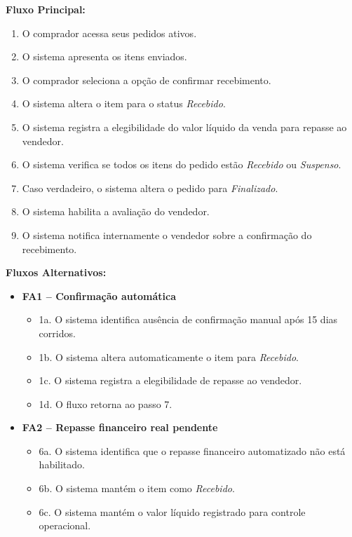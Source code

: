 \documentclass[
	article,			%
	11pt,				%
	oneside,			%
	a4paper,			%
	english,			%
	brazil,				%
	sumario=tradicional
	]{abntex2}
\begin{document}
\vspace{0.5em}
\noindent\textbf{Fluxo Principal:}
\begin{enumerate}[label=\arabic*.]
    \item O comprador acessa seus pedidos ativos.
    \item O sistema apresenta os itens enviados.
    \item O comprador seleciona a opção de confirmar recebimento.
    \item O sistema altera o item para o status \textit{Recebido}.
    \item O sistema registra a elegibilidade do valor líquido da venda para repasse ao vendedor.
    \item O sistema verifica se todos os itens do pedido estão \textit{Recebido} ou \textit{Suspenso}.
    \item Caso verdadeiro, o sistema altera o pedido para \textit{Finalizado}.
    \item O sistema habilita a avaliação do vendedor.
    \item O sistema notifica internamente o vendedor sobre a confirmação do recebimento.
\end{enumerate}

\vspace{0.5em}
\noindent\textbf{Fluxos Alternativos:}
\begin{itemize}[leftmargin=*]
    \item \textbf{FA1 – Confirmação automática}
    \begin{itemize}[label={}, leftmargin=0.5cm]
        \item 1a. O sistema identifica ausência de confirmação manual após 15 dias corridos.
        \item 1b. O sistema altera automaticamente o item para \textit{Recebido}.
        \item 1c. O sistema registra a elegibilidade de repasse ao vendedor.
        \item 1d. O fluxo retorna ao passo 7.
    \end{itemize}
    
    \item \textbf{FA2 – Repasse financeiro real pendente}
    \begin{itemize}[label={}, leftmargin=0.5cm]
        \item 6a. O sistema identifica que o repasse financeiro automatizado não está habilitado.
        \item 6b. O sistema mantém o item como \textit{Recebido}.
        \item 6c. O sistema mantém o valor líquido registrado para controle operacional.
    \end{itemize}
\end{itemize}
\end{document}
